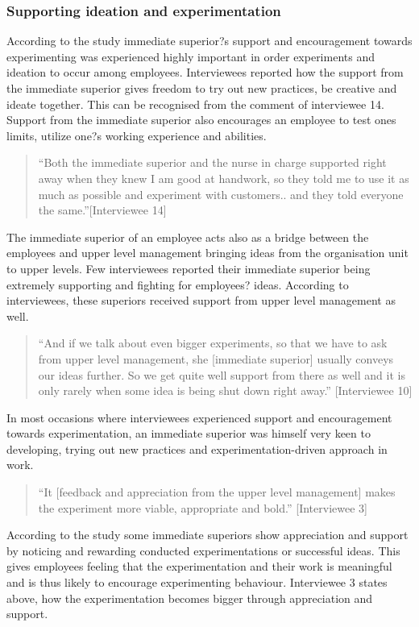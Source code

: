 \subsubsection{Supporting ideation and experimentation}

According to the study immediate superior?s support and encouragement towards experimenting was experienced highly important in order experiments and ideation to occur among employees. Interviewees reported how the support from the immediate superior gives freedom to try out new practices, be creative and ideate together. This can be recognised from the comment of interviewee 14. Support from the immediate superior also encourages an employee to test ones limits, utilize one?s working experience and abilities. 
\begin{quote}
 ``Both the immediate superior and the nurse in charge supported right away when they knew I am good at handwork, so they told me to use it as much as possible and experiment with customers.. and they told everyone the same.''[Interviewee 14]
\end{quote}
The immediate superior of an employee acts also as a bridge between the employees and upper level management bringing ideas from the organisation unit to upper levels. Few interviewees reported their immediate superior being extremely supporting and fighting for employees? ideas. According to interviewees, these superiors received support from upper level management as well. 
\begin{quote}
 ``And if we talk about even bigger experiments, so that we have to ask from upper level management, she [immediate superior] usually conveys our ideas further. So we get quite well support from there as well and it is only rarely when some idea is being shut down right away.'' [Interviewee 10]
\end{quote}
In most occasions where interviewees experienced support and encouragement towards experimentation, an immediate superior was himself very keen to developing, trying out new practices and experimentation-driven approach in work.   
\begin{quote}
``It [feedback and appreciation from the upper level management] makes the experiment more viable, appropriate and bold.'' [Interviewee 3]
\end{quote}
According to the study some immediate superiors show appreciation and support by noticing and rewarding conducted experimentations or successful ideas. This gives employees feeling that the experimentation and their work is meaningful and is thus likely to encourage experimenting behaviour. Interviewee 3 states above, how the experimentation becomes bigger through appreciation and support. 

